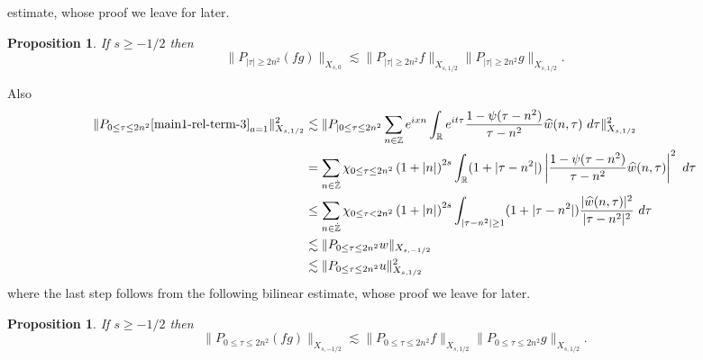 \documentclass[12pt,reqno]{amsart}
\numberwithin{equation}{section}  %
\renewcommand{\cref}{\Cref}
\newcommand{\rr}{\mathbb{R}}
\newcommand{\zz}{\mathbb{Z}}
\newcommand{\zzdot}{\dot{\zz}}
\newcommand{\wh}{\widehat}
\newtheorem{proposition}[theorem]{Proposition}
\begin{document}
estimate, whose proof we leave for later.
%
%
%
%
%
%
%
%
\begin{proposition}
\label{prop:bilinear-est}
	If $s \ge -1/2$ then 
	\begin{equation}
	  \| P_{| \tau | \ge 2n^{2}}(fg) \|_{X_{s,0}}
		    \lesssim \|P_{| \tau | \ge 2n^{2}}f\|_{X_{s,1/2}} \|P_{| \tau | \ge 2n^{2}}g\|_{X_{s,1/2}}.
	\end{equation}
%
%
%
%
\end{proposition}
%
%
Also
%
%
\begin{equation}
	\begin{split}
		\|P_{0 \le  \tau  \le 2n^{2}}\cref{main1-rel-term-3}_{a=1}\|_{X_{s,1/2}}^{2} 
    & \lesssim
    \| P_{| 0 \le \tau \le 2n^{2}} \sum_{n \in \zz} e^{ixn} \int_\rr 
		e^{it \tau} \frac{1 - \psi (\tau - n^{2} ) 
}{\tau - n^{2}} \wh{w}(n, \tau) \ 
		d \tau\|_{X_{s,1/2}}^{2}
		\\
    & = \sum_{n \in \zzdot} \chi_{0 \le \tau \le 2n^{2}}\left (1 + |n| \right )^{2s} \int_\rr (1 + | \tau - n^{2} |)
    \left | \frac{1 - \psi(\tau - n^{2 
})}{\tau - n^{2}} 
     \wh{w}(n, \tau) \right |^2 \ d 
		\tau 
		\\
    & \le 
    \sum_{n \in \zzdot} \chi_{0 \le  \tau  < 2n^{2}} \left (1 + |n| \right )^{2s} \int_{| \tau - n^{2}| \ge 1} (1 + | \tau - n^{2} |)
    \frac{|  \wh{w}(n, \tau)|^2}{|\tau - n^{2}|^2} 
		\ d 
		\tau 
		\\
		& \lesssim \| P_{0 \le  \tau \le 2n^{2}}w \|_{X_{s,-1/2}}
		\\
		& \lesssim \| P_{0 \le  \tau \le 2n^{2}}u \|^{2}_{X_{s,1/2}}
\end{split}
\end{equation}
where the last step follows from the following bilinear
estimate, whose proof we leave for later.
%
%
%
%
%
%
%
%
\begin{proposition}
\label{prop:bilinear-est2}
	If $s \ge -1/2$ then 
	\begin{equation}
	  \| P_{0 \le  \tau  \le 2n^{2}}(fg) \|_{X_{s,-1/2}}
		    \lesssim \|P_{0 \le  \tau \le 2n^{2}}f\|_{X_{s,1/2}} \|P_{0 \le \tau \le 2n^{2}}g\|_{X_{s,1/2}}.
	\end{equation}
%
%
%
%
\end{proposition}
\end{document}
